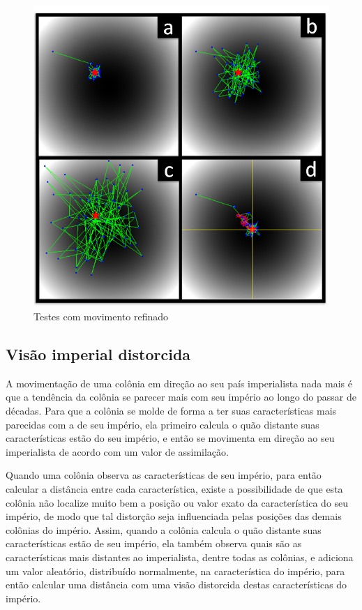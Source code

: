 \begin{figure}[htp]
	\centering
	\includegraphics[scale=0.9]{Figuras/Movimento_Refinado.png}
	\caption{Testes com movimento refinado}
	\label{fig:Movimento_Refinado}
\end{figure}






\subsection{Visão imperial distorcida}
\label{Visão imperial distorcida}


A movimentação de uma colônia em direção ao seu país imperialista nada mais é que a tendência da colônia  se parecer mais com seu império ao longo do passar de décadas. Para que a colônia se molde de forma a ter suas características mais parecidas com a de seu império, ela primeiro calcula o quão distante suas características estão do seu império, e então se movimenta em direção ao seu imperialista de acordo com um valor de assimilação. 

Quando uma colônia observa as características de seu império, para então calcular a distância entre cada característica, existe a possibilidade de que esta colônia não localize muito bem a posição ou valor exato da característica do seu império, de modo que tal distorção seja influenciada pelas posições das demais colônias do império. Assim, quando a colônia calcula o quão distante suas características estão de seu império, ela também observa quais são as características mais distantes ao imperialista, dentre todas as colônias, e adiciona um valor aleatório, distribuído normalmente, na característica do império, para então calcular uma distância com uma visão distorcida destas características do império.

